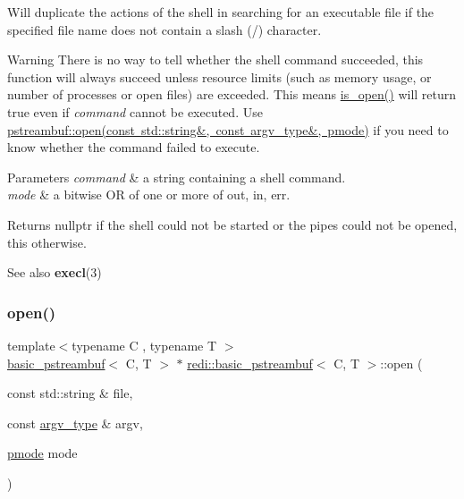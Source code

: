 Will duplicate the actions of the shell in searching for an executable file if the specified file name does not contain a slash (/) character.

\begin{DoxyWarning}{Warning}
There is no way to tell whether the shell command succeeded, this function will always succeed unless resource limits (such as memory usage, or number of processes or open files) are exceeded. This means \mbox{\hyperlink{classredi_1_1basic__pstreambuf_af28fab6dc978b25c92740400512a61bc}{is\+\_\+open()}} will return true even if {\itshape command} cannot be executed. Use \mbox{\hyperlink{classredi_1_1basic__pstreambuf_a2dd6e94de1a2fa0e9e4505934b246aec}{pstreambuf\+::open(const std\+::string\&, const argv\+\_\+type\&, pmode)}} if you need to know whether the command failed to execute.
\end{DoxyWarning}

\begin{DoxyParams}{Parameters}
{\em command} & a string containing a shell command. \\
\hline
{\em mode} & a bitwise OR of one or more of {\ttfamily out}, {\ttfamily in}, {\ttfamily err}. \\
\hline
\end{DoxyParams}
\begin{DoxyReturn}{Returns}
nullptr if the shell could not be started or the pipes could not be opened, {\ttfamily this} otherwise. 
\end{DoxyReturn}
\begin{DoxySeeAlso}{See also}
{\bfseries execl}(3) 
\end{DoxySeeAlso}
\mbox{\label{classredi_1_1basic__pstreambuf_a2dd6e94de1a2fa0e9e4505934b246aec}} 
\subsubsection{\texorpdfstring{open()}{open()}\hspace{0.1cm}{\footnotesize\ttfamily [2/2]}}
{\footnotesize\ttfamily template$<$typename C , typename T $>$ \\
\mbox{\hyperlink{classredi_1_1basic__pstreambuf}{basic\+\_\+pstreambuf}}$<$ C, T $>$ $\ast$ \mbox{\hyperlink{classredi_1_1basic__pstreambuf}{redi\+::basic\+\_\+pstreambuf}}$<$ C, T $>$\+::open (\begin{DoxyParamCaption}\item[{const std\+::string \&}]{file,  }\item[{const \mbox{\hyperlink{structredi_1_1pstreams_af902b894b095c1875e96c10129489467}{argv\+\_\+type}} \&}]{argv,  }\item[{\mbox{\hyperlink{structredi_1_1pstreams_a1eae4aad88812af03a0fbb3ec13c50b7}{pmode}}}]{mode }\end{DoxyParamCaption})}



